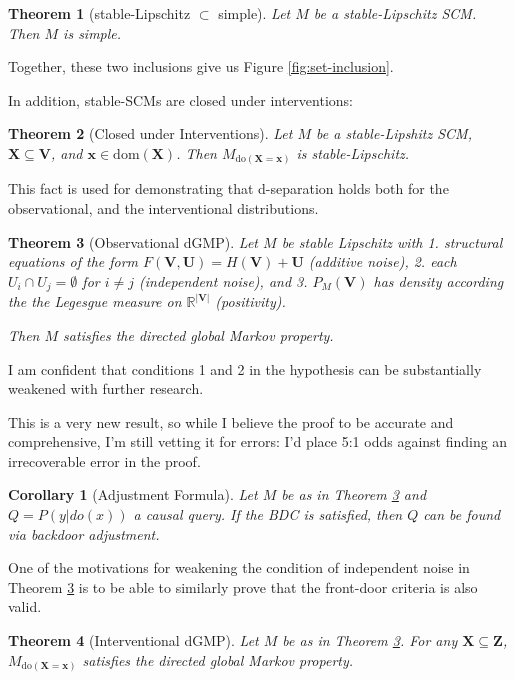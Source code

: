 \documentclass[letterpaper,10pt]{article}
\newtheorem{theorem}{Theorem}
\newtheorem{corollary}{Corollary}
\newcommand\R{\mathbb{R}}
\begin{document}
\begin{theorem}[stable-Lipschitz $\subset$ simple] \label{simple-subset}
Let $M$ be a stable-Lipschitz SCM. Then $M$ is simple.
\end{theorem}

Together, these two inclusions give us Figure \ref{fig:set-inclusion}.

In addition, stable-SCMs are closed under interventions:

\begin{theorem}[Closed under Interventions] \label{int-closed}
Let $M$ be a stable-Lipshitz SCM, $\mathbf{X}\subseteq\mathbf{V}$, and $\mathbf{x}\in\text{dom}(\mathbf{X})$. Then $M_{\text{do}(\mathbf{X}=\mathbf{x})}$ is stable-Lipschitz.
\end{theorem}
This fact is used for demonstrating that d-separation holds both for the observational, and the interventional distributions.



\begin{theorem}[Observational dGMP] \label{thrm:obs}
Let $M$ be stable Lipschitz with 1. structural equations of the form $F(\mathbf{V},\mathbf{U})=H(\mathbf{V})+\mathbf{U}$ (additive noise), 2. each $U_i\cap U_j=\emptyset$ for $i\neq j$ (independent noise), and 3. $P_M(\mathbf{V})$ has density according the the Legesgue measure on $\R^{|\mathbf{V}|}$ (positivity). 

Then $M$ satisfies the directed global Markov property.
\end{theorem}

I am confident that conditions 1 and 2 in the hypothesis can be substantially weakened with further research.

This is a very new result, so while I believe the proof to be accurate and comprehensive, I'm still vetting it for errors: I'd place 5:1 odds against finding an irrecoverable error in the proof. 

\begin{corollary}[Adjustment Formula] \label{adjustment}
Let $M$ be as in Theorem \ref{thrm:obs} and $Q=P(y|do(x))$ a causal query. If the BDC is satisfied, then $Q$ can be found via backdoor adjustment.
\end{corollary}

One of the motivations for weakening the condition of independent noise in Theorem \ref{thrm:obs} is to be able to similarly prove that the front-door criteria is also valid.

\begin{theorem}[Interventional dGMP] \label{thrm:int}
Let $M$ be as in Theorem \ref{thrm:obs}. For any $\mathbf{X}\subseteq \mathbf{Z}$, $M_{\text{do}(\mathbf{X}=\mathbf{x})}$ satisfies the directed global Markov property.
\end{theorem}
\end{document}
